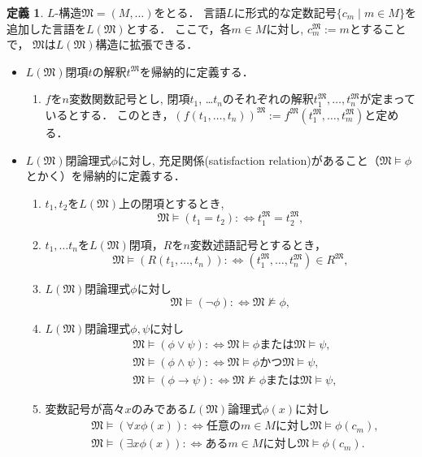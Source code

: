 \documentclass[uplatex, dvipdfmx]{jsarticle}
\newcommand{\M}{\mathfrak{M}}
\newcommand{\defiff}{ :\Leftrightarrow}
\theoremstyle{definition}
\newtheorem{definition}{定義}[section]
\begin{document}
\begin{definition}
     $L$-構造$\M = (M,\dots)$をとる．
     言語$L$に形式的な定数記号$\{c_m \mid m \in M\}$を追加した言語を$L(\M)$とする．
     ここで，各$m \in M$に対し, $c_m^{\M}:=m$とすることで，
     $\M$は$L(\M)$構造に拡張できる．
     \begin{itemize}
          \item $L(\M)$閉項$t$の解釈$t^\M$を帰納的に定義する．
          \begin{enumerate}
               \item $f$を$n$変数関数記号とし, 閉項$t_1$, \dots $t_n$のそれぞれの解釈$t_1^\M,\dots,t_n^\M$が定まっているとする．
               このとき，$(f(t_1,\dots,t_n))^\M:=f^\M(t_1^\M,\dots,t_m^\M)$と定める．
          \end{enumerate}
          \item $L(\M)$閉論理式$\phi$に対し, 充足関係(satisfaction relation)があること（$\M \models \phi$とかく）を帰納的に定義する．
          \begin{enumerate}
               \item $t_1,t_2$を$L(\M)$上の閉項とするとき, 
               \[
                    \M \models (t_1 = t_2) \defiff t_1^\M = t_2^\M,
               \]
               \item $t_1,\dots t_n$を$L(\M)$閉項，$R$を$n$変数述語記号とするとき，
               \[
                    \M \models (R(t_1, \dots, t_n)) \defiff (t_1^\M, \dots, t_n^\M) \in R^\M,
               \]
               \item $L(\M)$閉論理式$\phi$に対し
               \[
                    \M \models (\lnot \phi) \defiff \M \not\models \phi,
               \]
               \item $L(\M)$閉論理式$\phi, \psi$に対し
               \begin{align*}
                    &\M \models (\phi \lor \psi) \defiff \M \models \phi \text{または} \M \models \psi,\\
                    &\M \models (\phi \land \psi) \defiff \M \models \phi \text{かつ} \M \models \psi,\\
                    &\M \models (\phi \rightarrow \psi) \defiff \M \not\models \phi \text{または} \M \models \psi,
               \end{align*}
               \item 変数記号が高々$x$のみである$L(\M)$論理式$\phi(x)$に対し
               \begin{align*}
                    &\M \models (\forall x \phi(x)) \defiff \text{任意の$m \in M$に対し}\M \models \phi(c_m),\\
                    &\M \models (\exists x \phi(x)) \defiff \text{ある$m \in M$に対し}\M \models\phi(c_m).
               \end{align*}
          \end{enumerate}
     \end{itemize}
\end{definition}
\end{document}
